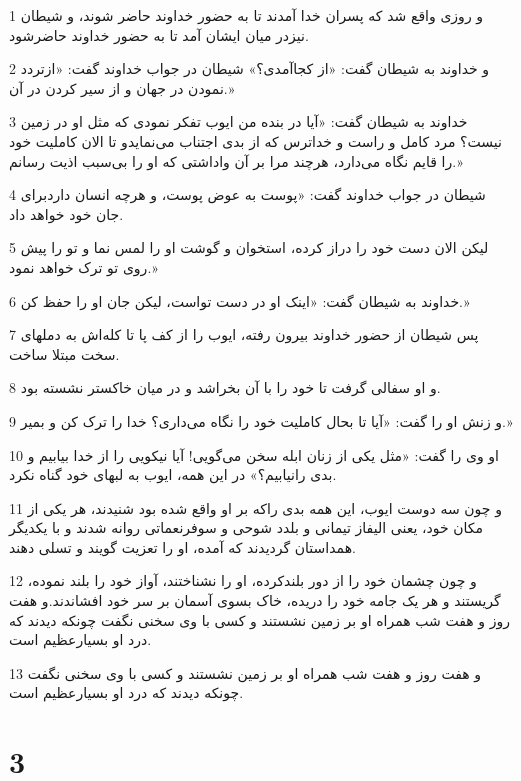 \par 1 و روزی واقع شد که پسران خدا آمدند تا به حضور خداوند حاضر شوند، و شیطان نیزدر میان ایشان آمد تا به حضور خداوند حاضرشود.
\par 2 و خداوند به شیطان گفت: «از کجاآمدی؟» شیطان در جواب خداوند گفت: «ازتردد نمودن در جهان و از سیر کردن در آن.»
\par 3 خداوند به شیطان گفت: «آیا در بنده من ایوب تفکر نمودی که مثل او در زمین نیست؟ مرد کامل و راست و خداترس که از بدی اجتناب می‌نمایدو تا الان کاملیت خود را قایم نگاه می‌دارد، هرچند مرا بر آن واداشتی که او را بی‌سبب اذیت رسانم.»
\par 4 شیطان در جواب خداوند گفت: «پوست به عوض پوست، و هر‌چه انسان داردبرای جان خود خواهد داد.
\par 5 لیکن الان دست خود را دراز کرده، استخوان و گوشت او را لمس نما و تو را پیش روی تو ترک خواهد نمود.»
\par 6 خداوند به شیطان گفت: «اینک او در دست تواست، لیکن جان او را حفظ کن.»
\par 7 پس شیطان از حضور خداوند بیرون رفته، ایوب را از کف پا تا کله‌اش به دملهای سخت مبتلا ساخت.
\par 8 و او سفالی گرفت تا خود را با آن بخراشد و در میان خاکستر نشسته بود.
\par 9 و زنش او را گفت: «آیا تا بحال کاملیت خود را نگاه می‌داری؟ خدا را ترک کن و بمیر.»
\par 10 او وی را گفت: «مثل یکی از زنان ابله سخن می‌گویی! آیا نیکویی را از خدا بیابیم و بدی رانیابیم؟» در این همه، ایوب به لبهای خود گناه نکرد.
\par 11 و چون سه دوست ایوب، این همه بدی راکه بر او واقع شده بود شنیدند، هر یکی از مکان خود، یعنی الیفاز تیمانی و بلدد شوحی و سوفرنعماتی روانه شدند و با یکدیگر همداستان گردیدند که آمده، او را تعزیت گویند و تسلی دهند.
\par 12 و چون چشمان خود را از دور بلندکرده، او را نشناختند، آواز خود را بلند نموده، گریستند و هر یک جامه خود را دریده، خاک بسوی آسمان بر سر خود افشاندند.و هفت روز و هفت شب همراه او بر زمین نشستند و کسی با وی سخنی نگفت چونکه دیدند که درد او بسیارعظیم است.
\par 13 و هفت روز و هفت شب همراه او بر زمین نشستند و کسی با وی سخنی نگفت چونکه دیدند که درد او بسیارعظیم است.
 
\chapter{3}


